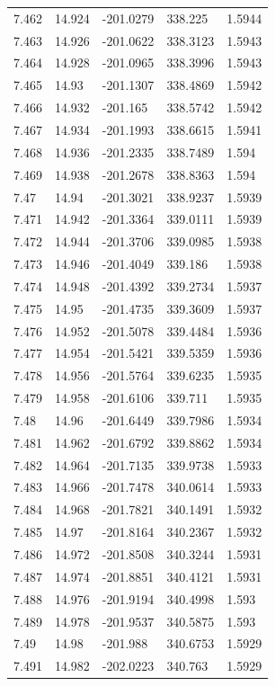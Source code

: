 \begin{tabular}{lllll}
7.462 & 14.924 & -201.0279 & 338.225 & 1.5944 \\
7.463 & 14.926 & -201.0622 & 338.3123 & 1.5943 \\
7.464 & 14.928 & -201.0965 & 338.3996 & 1.5943 \\
7.465 & 14.93 & -201.1307 & 338.4869 & 1.5942 \\
7.466 & 14.932 & -201.165 & 338.5742 & 1.5942 \\
7.467 & 14.934 & -201.1993 & 338.6615 & 1.5941 \\
7.468 & 14.936 & -201.2335 & 338.7489 & 1.594 \\
7.469 & 14.938 & -201.2678 & 338.8363 & 1.594 \\
7.47 & 14.94 & -201.3021 & 338.9237 & 1.5939 \\
7.471 & 14.942 & -201.3364 & 339.0111 & 1.5939 \\
7.472 & 14.944 & -201.3706 & 339.0985 & 1.5938 \\
7.473 & 14.946 & -201.4049 & 339.186 & 1.5938 \\
7.474 & 14.948 & -201.4392 & 339.2734 & 1.5937 \\
7.475 & 14.95 & -201.4735 & 339.3609 & 1.5937 \\
7.476 & 14.952 & -201.5078 & 339.4484 & 1.5936 \\
7.477 & 14.954 & -201.5421 & 339.5359 & 1.5936 \\
7.478 & 14.956 & -201.5764 & 339.6235 & 1.5935 \\
7.479 & 14.958 & -201.6106 & 339.711 & 1.5935 \\
7.48 & 14.96 & -201.6449 & 339.7986 & 1.5934 \\
7.481 & 14.962 & -201.6792 & 339.8862 & 1.5934 \\
7.482 & 14.964 & -201.7135 & 339.9738 & 1.5933 \\
7.483 & 14.966 & -201.7478 & 340.0614 & 1.5933 \\
7.484 & 14.968 & -201.7821 & 340.1491 & 1.5932 \\
7.485 & 14.97 & -201.8164 & 340.2367 & 1.5932 \\
7.486 & 14.972 & -201.8508 & 340.3244 & 1.5931 \\
7.487 & 14.974 & -201.8851 & 340.4121 & 1.5931 \\
7.488 & 14.976 & -201.9194 & 340.4998 & 1.593 \\
7.489 & 14.978 & -201.9537 & 340.5875 & 1.593 \\
7.49 & 14.98 & -201.988 & 340.6753 & 1.5929 \\
7.491 & 14.982 & -202.0223 & 340.763 & 1.5929 \\

\end{tabular}
